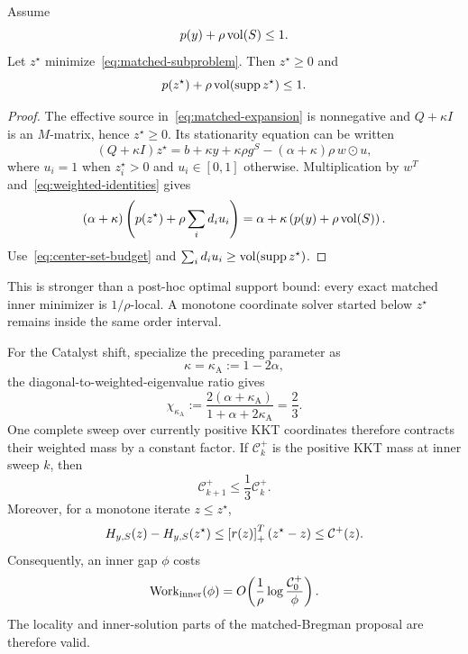 \begin{lemma}
\label{lem:matched-budget}
Assume
\begin{equation}
  p(y)+\rho\operatorname{vol}(S)\le1.
  \label{eq:center-set-budget}
\end{equation}
Let $z^\star$ minimize~\eqref{eq:matched-subproblem}.  Then $z^\star\ge0$ and
\begin{equation}
 p(z^\star)+\rho\operatorname{vol}(\operatorname{supp} z^\star)\le1.
 \label{eq:matched-support-budget}
\end{equation}
\end{lemma}

\begin{proof}
The effective source in~\eqref{eq:matched-expansion} is nonnegative and
$Q+\kappa I$ is an $M$-matrix, hence $z^\star\ge0$.  Its stationarity equation
can be written
\[
 (Q+\kappa I)z^\star
 =b+\kappa y+\kappa\rho g^S
  -(\alpha+\kappa)\rho\,w\odot u,
\]
where $u_i=1$ when $z_i^\star>0$ and $u_i\in[0,1]$ otherwise.  Multiplication
by $w^T$ and~\eqref{eq:weighted-identities} gives
\[
 (\alpha+\kappa)
 \left(p(z^\star)+\rho\sum_i d_i u_i\right)
 =\alpha+\kappa\left(p(y)+\rho\operatorname{vol}(S)\right).
\]
Use~\eqref{eq:center-set-budget} and
$\sum_i d_i u_i\ge\operatorname{vol}(\operatorname{supp} z^\star)$.
\end{proof}

This is stronger than a post-hoc optimal support bound: every exact matched
inner minimizer is $1/\rho$-local.  A monotone coordinate solver started below
$z^\star$ remains inside the same order interval.

For the Catalyst shift, specialize the preceding parameter as
\begin{equation}
  \kappa=\kappa_{\mathrm A}:=1-2\alpha,
  \label{eq:kappa}
\end{equation}
the diagonal-to-weighted-eigenvalue ratio gives
\begin{equation}
 \chi_{\kappa_{\mathrm A}}
 :=\frac{2(\alpha+\kappa_{\mathrm A})}
         {1+\alpha+2\kappa_{\mathrm A}}
 =\frac23.
 \label{eq:inner-contraction}
\end{equation}
One complete sweep over currently positive KKT coordinates therefore contracts
their weighted mass by a constant factor.  If $\mathcal C_k^+$ is the positive
KKT mass at inner sweep $k$, then
\[
 \mathcal C_{k+1}^+\le\frac13\mathcal C_k^+.
\]
Moreover, for a monotone iterate $z\le z^\star$,
\[
 H_{y,S}(z)-H_{y,S}(z^\star)
 \le \left[r(z)\right]_{+}^T(z^\star-z)
 \le \mathcal C^+(z).
\]
Consequently, an inner gap $\phi$ costs
\begin{equation}
 \operatorname{Work}_{\mathrm{inner}}(\phi)
 =O\!\left(
   \frac1\rho\log\frac{\mathcal C_0^+}{\phi}
 \right).
 \label{eq:matched-inner-work}
\end{equation}
The locality and inner-solution parts of the matched-Bregman proposal are
therefore valid.

